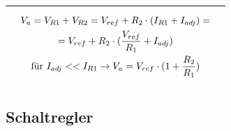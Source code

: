 \begin{longtable}{|l|l|l|}
\begin{minipage}{6cm}
\end{minipage}
&
\begin{minipage}{8cm}
\begin{gather*}
V_{a}=V_{R1}+V_{R2}=V_{ref}+R_{2} \cdot (I_{R1}+I_{adj})=\notag\\=V_{ref}+R_{2} \cdot (\frac{V_{ref}}{R_{1}}+I_{adj})\\
\text{für }I_{adj}<< I_{R1} \to V_{a}=V_{ref} \cdot (1+\frac{R_{2}}{R_{1}})
\end{gather*}
\end{minipage}
\\
\hline
\end{longtable}

\subsection{Schaltregler} 
